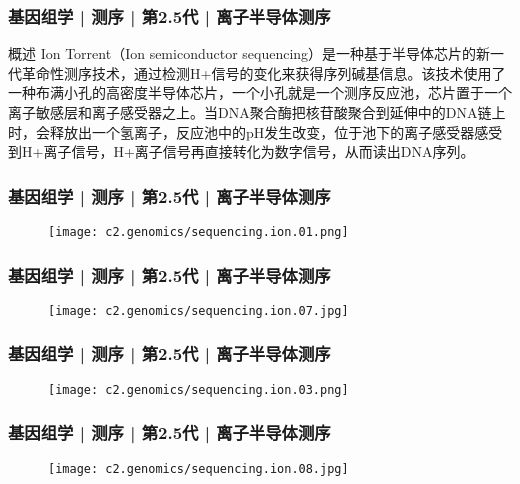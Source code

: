 \begin{frame}
  \frametitle{基因组学 | 测序 | 第2.5代 | 离子半导体测序}
  \begin{block}{概述}
    Ion Torrent（Ion semiconductor sequencing）是一种基于半导体芯片的新一代革命性测序技术，通过检测H+信号的变化来获得序列碱基信息。该技术使用了一种布满小孔的高密度半导体芯片，一个小孔就是一个测序反应池，芯片置于一个离子敏感层和离子感受器之上。当DNA聚合酶把核苷酸聚合到延伸中的DNA链上时，会释放出一个氢离子，反应池中的pH发生改变，位于池下的离子感受器感受到H+离子信号，H+离子信号再直接转化为数字信号，从而读出DNA序列。
  \end{block}
\end{frame}

\begin{frame}
  \frametitle{基因组学 | 测序 | 第2.5代 | 离子半导体测序}
  \begin{figure}
    \centering
    \texttt{[image: c2.genomics/sequencing.ion.01.png]}
  \end{figure}
\end{frame}


\begin{frame}
  \frametitle{基因组学 | 测序 | 第2.5代 | 离子半导体测序}
  \begin{figure}
    \centering
    \texttt{[image: c2.genomics/sequencing.ion.07.jpg]}
  \end{figure}
\end{frame}

\begin{frame}
  \frametitle{基因组学 | 测序 | 第2.5代 | 离子半导体测序}
  \begin{figure}
    \centering
    \texttt{[image: c2.genomics/sequencing.ion.03.png]}
  \end{figure}
\end{frame}

\begin{frame}
  \frametitle{基因组学 | 测序 | 第2.5代 | 离子半导体测序}
  \begin{figure}
    \centering
    \texttt{[image: c2.genomics/sequencing.ion.08.jpg]}
  \end{figure}
\end{frame}

